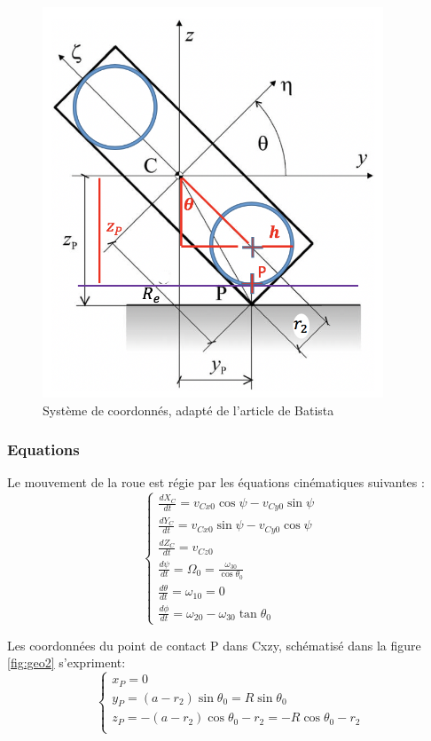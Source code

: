 \begin{figure}[htb]
\centering
\includegraphics[width=4in]{batista/ref2.png}
\caption{Système de coordonnés, adapté de l'article de Batista \cite{Batista}}
\label{fig:ref2}
\end{figure}

\subsubsection{Equations}
Le mouvement de la roue est régie par les équations cinématiques suivantes \cite{Batista}:
\begin{equation}
  \begin{cases}
    \frac{dX_C}{dt}=v_{Cx0} \cos{\psi}- v_{Cy0} \sin{\psi}\\
    \frac{dY_C}{dt}=v_{Cx0} \sin{\psi}- v_{Cy0} \cos{\psi}\\
    \frac{dZ_C}{dt}=v_{Cz0} \\
    \frac{d\psi}{dt}=\Omega_0=\frac{\omega_{30}}{\cos{\theta_0}}\\
    \frac{d\theta}{dt}=\omega_{10}=0\\
    \frac{d\phi}{dt}=\omega_{20}-\omega_{30} \tan{\theta_0}
  \end{cases}
  \label{eq:b1}
\end{equation}


Les coordonnées du point de contact P dans C{xzy}, schématisé dans la figure \ref{fig:geo2} s'expriment:
\begin{equation}
  \begin{cases}
    x_P=0\\
    y_P=(a-r_2)\sin{\theta_0}=R\sin{\theta_0}\\
    z_P=-(a-r_2)\cos{\theta_0}-r_2=-R\cos{\theta_0}-r_2\\
  \end{cases}
  \label{eq:b2}
\end{equation}

